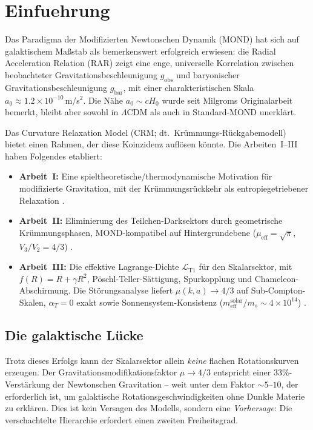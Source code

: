 \documentclass[aps,prd,twocolumn,superscriptaddress,nofootinbib]{revtex4-2}
\begin{document}
\section{Einfuehrung}
\label{sec:intro}

Das Paradigma der Modifizierten Newtonschen Dynamik (MOND) \cite{Milgrom1983} hat sich auf galaktischem Ma\ss{}stab als bemerkenswert erfolgreich erwiesen: die Radial Acceleration Relation (RAR) \cite{McGaugh2016} zeigt eine enge, universelle Korrelation zwischen beobachteter Gravitationsbeschleunigung $g_{\mathrm{obs}}$ und baryonischer Gravitationsbeschleunigung $g_{\mathrm{bar}}$, mit einer charakteristischen Skala $a_0 \approx 1.2 \times 10^{-10}$\,m/s$^2$. Die N\"ahe $a_0 \sim cH_0$ wurde seit Milgroms Originalarbeit bemerkt, bleibt aber sowohl in $\Lambda$CDM als auch in Standard-MOND unerkl\"art.

Das Curvature Relaxation Model (CRM; dt.\ Kr\"ummungs-R\"uckgabemodell) bietet einen Rahmen, der diese Koinzidenz aufl\"osen k\"onnte. Die Arbeiten~I--III \cite{Geiger2026,Geiger2026b,Geiger2026c} haben Folgendes etabliert:
\begin{itemize}
\item \textbf{Arbeit~I:} Eine spieltheoretische/thermodynamische Motivation f\"ur modifizierte Gravitation, mit der Kr\"ummungsr\"uckkehr als entropiegetriebener Relaxation \cite{Geiger2026}.
\item \textbf{Arbeit~II:} Eliminierung des Teilchen-Darksektors durch geometrische Kr\"ummungsphasen, MOND-kompatibel auf Hintergrundebene ($\mu_{\mathrm{eff}} = \sqrt{\pi}$, $V_3/V_2 = 4/3$) \cite{Geiger2026b}.
\item \textbf{Arbeit~III:} Die effektive Lagrange-Dichte $\mathcal{L}_{\mathrm{T1}}$ f\"ur den Skalarsektor, mit $f(R) = R + \gamma R^2$, P\"oschl-Teller-S\"attigung, Spurkopplung und Chameleon-Abschirmung. Die St\"orungsanalyse liefert $\mu(k,a) \to 4/3$ auf Sub-Compton-Skalen, $\alpha_T = 0$ exakt sowie Sonnensystem-Konsistenz ($m_{\mathrm{eff}}^{\mathrm{solar}}/m_s \sim 4 \times 10^{14}$) \cite{Geiger2026c}.
\end{itemize}

\subsection{Die galaktische L\"ucke}

Trotz dieses Erfolgs kann der Skalarsektor allein \textit{keine} flachen Rotationskurven erzeugen. Der Gravitationsmodifikationsfaktor $\mu \to 4/3$ entspricht einer $33\%$-Verst\"arkung der Newtonschen Gravitation -- weit unter dem Faktor $\sim 5$--$10$, der erforderlich ist, um galaktische Rotationsgeschwindigkeiten ohne Dunkle Materie zu erkl\"aren. Dies ist kein Versagen des Modells, sondern eine \textit{Vorhersage}: Die verschachtelte Hierarchie erfordert einen zweiten Freiheitsgrad.
\end{document}
